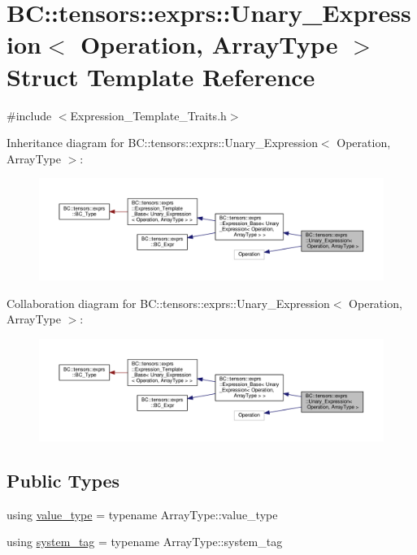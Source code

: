 \hypertarget{structBC_1_1tensors_1_1exprs_1_1Unary__Expression}{}\section{BC\+:\+:tensors\+:\+:exprs\+:\+:Unary\+\_\+\+Expression$<$ Operation, Array\+Type $>$ Struct Template Reference}
\label{structBC_1_1tensors_1_1exprs_1_1Unary__Expression}


{\ttfamily \#include $<$Expression\+\_\+\+Template\+\_\+\+Traits.\+h$>$}



Inheritance diagram for BC\+:\+:tensors\+:\+:exprs\+:\+:Unary\+\_\+\+Expression$<$ Operation, Array\+Type $>$\+:
\nopagebreak
\begin{figure}[H]
\begin{center}
\leavevmode
\includegraphics[width=350pt]{structBC_1_1tensors_1_1exprs_1_1Unary__Expression__inherit__graph}
\end{center}
\end{figure}


Collaboration diagram for BC\+:\+:tensors\+:\+:exprs\+:\+:Unary\+\_\+\+Expression$<$ Operation, Array\+Type $>$\+:
\nopagebreak
\begin{figure}[H]
\begin{center}
\leavevmode
\includegraphics[width=350pt]{structBC_1_1tensors_1_1exprs_1_1Unary__Expression__coll__graph}
\end{center}
\end{figure}
\subsection*{Public Types}
\begin{DoxyCompactItemize}
\item 
using \hyperlink{structBC_1_1tensors_1_1exprs_1_1Unary__Expression_aeca5642a5f8dcb901d3b91cd60159bf6}{value\+\_\+type} = typename Array\+Type\+::value\+\_\+type
\item 
using \hyperlink{structBC_1_1tensors_1_1exprs_1_1Unary__Expression_a6fff22faba042575b5fd0a403825bcd4}{system\+\_\+tag} = typename Array\+Type\+::system\+\_\+tag
\end{DoxyCompactItemize}
